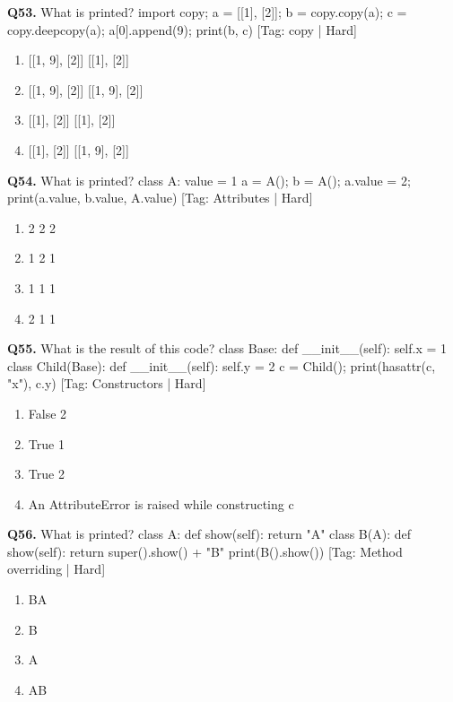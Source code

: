 \vspace{2mm}
\noindent\textbf{Q53.} What is printed? import copy; a = [[1], [2]]; b = copy.copy(a); c = copy.deepcopy(a); a[0].append(9); print(b, c) \hfill [Tag: copy | Hard]
\begin{enumerate}[label=(\alph*),topsep=2pt,itemsep=1pt,partopsep=0pt,parsep=0pt]
    \item {[[1, 9], [2]] [[1], [2]]}
    \item {[[1, 9], [2]] [[1, 9], [2]]}
    \item {[[1], [2]] [[1], [2]]}
    \item {[[1], [2]] [[1, 9], [2]]}
\end{enumerate}
\vspace{2mm}
\noindent\textbf{Q54.} What is printed? class A: value = 1 a = A(); b = A(); a.value = 2; print(a.value, b.value, A.value) \hfill [Tag: Attributes | Hard]
\begin{enumerate}[label=(\alph*),topsep=2pt,itemsep=1pt,partopsep=0pt,parsep=0pt]
    \item {2 2 2}
    \item {1 2 1}
    \item {1 1 1}
    \item {2 1 1}
\end{enumerate}
\vspace{2mm}
\noindent\textbf{Q55.} What is the result of this code? class Base: def \_\_init\_\_(self): self.x = 1 class Child(Base): def \_\_init\_\_(self): self.y = 2 c = Child(); print(hasattr(c, "x"), c.y) \hfill [Tag: Constructors | Hard]
\begin{enumerate}[label=(\alph*),topsep=2pt,itemsep=1pt,partopsep=0pt,parsep=0pt]
    \item {False 2}
    \item {True 1}
    \item {True 2}
    \item {An AttributeError is raised while constructing c}
\end{enumerate}
\vspace{2mm}
\noindent\textbf{Q56.} What is printed? class A: def show(self): return "A" class B(A): def show(self): return super().show() + "B" print(B().show()) \hfill [Tag: Method overriding | Hard]
\begin{enumerate}[label=(\alph*),topsep=2pt,itemsep=1pt,partopsep=0pt,parsep=0pt]
    \item {BA}
    \item {B}
    \item {A}
    \item {AB}
\end{enumerate}
